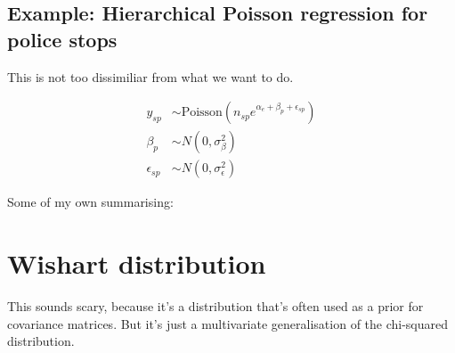 \documentclass[11pt]{amsart}
\newcommand{\Poisson}[1] {\text{Poisson} ( #1 )}
\begin{document}
\subsection{Example: Hierarchical Poisson regression for police stops}
This is not too dissimiliar from what we want to do.

\begin{align*}
y_{sp} & \sim \Poisson{n_{sp} e^{\alpha_e + \beta_p + \epsilon_{sp}}} \\
\beta_p & \sim N(0, \sigma_\beta^2) \\
\epsilon_{sp} & \sim N(0, \sigma_\epsilon^2)
\end{align*}


Some of my own summarising:
\section{Wishart distribution}
This sounds scary, because it's a distribution that's often used as a prior
for covariance matrices. But it's just a multivariate generalisation of the
chi-squared distribution.
\end{document}
